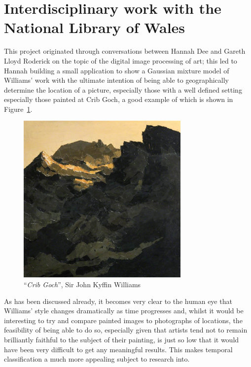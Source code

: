 \section{Interdisciplinary work with the National Library of Wales}

This project originated through conversations between Hannah Dee and Gareth Lloyd Roderick on the
topic of the digital image processing of art; this led to Hannah building a small application to
show a Gaussian mixture model of Williams' work with the ultimate intention of being able to geographically
determine the location of a picture, especially those with a well defined setting especially those
painted at Crib Goch, a good example of which is shown in Figure~\ref{fig:crib-goch}.

\begin{figure}[h]
\centering
\includegraphics[width=0.75\textwidth]{img/crib_goch.jpg}
\caption[``\emph{Crib Goch}'']{``\emph{Crib Goch}'', Sir John Kyffin Williams}\label{fig:crib-goch}
\end{figure}

As has been discussed already, it becomes very clear to the human eye that Williams' style changes
dramatically as time progresses and, whilst it would be interesting to try and compare painted 
images to photographs of locations, the feasibility of being able to do so, especially given that
artists tend not to remain brilliantly faithful to the subject of their painting, is just so low
that it would have been very difficult to get any meaningful results. This makes temporal 
classification a much more appealing subject to research into.

